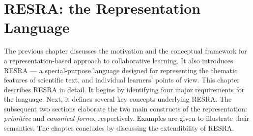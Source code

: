 









\setcounter{chapter}{2}
\chapter{RESRA: the Representation Language}
\label{sec:resra}

The previous chapter discusses the motivation and the conceptual framework
for a representation-based approach to collaborative learning. It also
introduces RESRA --- a special-purpose language designed for representing
the thematic features of scientific text, and individual learners' points
of view. This chapter describes RESRA in detail. It begins by identifying
four major requirements for the language. Next, it defines several key
concepts underlying RESRA. The subsequent two sections elaborate the two
main constructs of the representation: {\it primitive\/} and {\it canonical
forms}, respectively. Examples are given to illustrate their semantics. The
chapter concludes by discussing the extendibility of RESRA.

